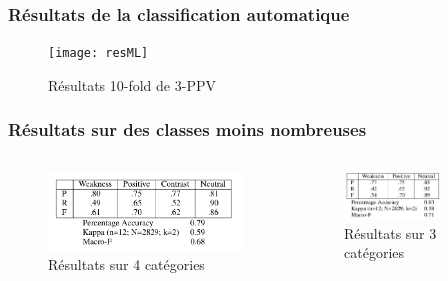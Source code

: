 \documentclass[10pt]{beamer}
\begin{document}
\begin{frame}
  \frametitle{Résultats de la classification automatique}
  \begin{figure}[h]
    \centering
    \texttt{[image: resML]}
    \caption{Résultats 10-fold de 3-PPV}
    \label{fig:resml12}
  \end{figure}
\end{frame}

\begin{frame}
  \frametitle{Résultats sur des classes moins nombreuses}
     \begin{columns}[t]
      \begin{column}{0.5\textwidth}
        \begin{figure}[h]
          \centering
          \includegraphics[width=\textwidth]{shortres4}
          \caption{Résultats sur 4 catégories}
          \label{fig:res4}
        \end{figure}
      \end{column}
      \begin{column}{0.5\textwidth}
       \begin{figure}[h]
          \centering
          \includegraphics[width=0.75\textwidth]{shortres3}
          \caption{Résultats sur 3 catégories}
          \label{fig:res3}
        \end{figure}
      \end{column}
   \end{columns}
\end{frame}
\end{document}
